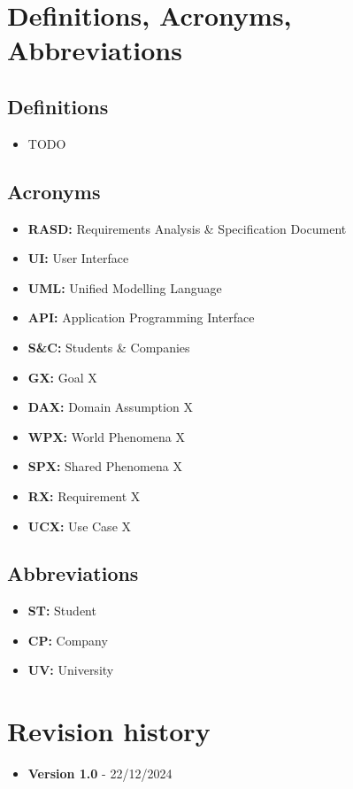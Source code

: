 \section{Definitions, Acronyms, Abbreviations}
\label{sec:definitions_acronyms_abbreviations}%

\subsection{Definitions}
\label{subsec:definitions}%
\begin{itemize}
\item TODO
\end{itemize}


\subsection{Acronyms}
\label{subsec:acronyms}%
\begin{itemize}
    \item \textbf{RASD:} Requirements Analysis \& Specification Document 
    \item \textbf{UI:} User Interface
    \item \textbf{UML:} Unified Modelling Language
    \item \textbf{API:} Application Programming Interface
    \item \textbf{S\&C:} Students \& Companies
    \item \textbf{GX:} Goal X
    \item \textbf{DAX:} Domain Assumption X 
    \item \textbf{WPX:} World Phenomena X
    \item \textbf{SPX:} Shared Phenomena X
    \item \textbf{RX:} Requirement X
    \item \textbf{UCX:} Use Case X
\end{itemize}


\subsection{Abbreviations}
\label{subsec:abbreviations}%
\begin{itemize}
    \item \textbf{ST:} Student
    \item \textbf{CP:} Company
    \item \textbf{UV:} University
\end{itemize}


\section{Revision history}
\label{sec:revision_history}%
\begin{itemize}
    \item \textbf{Version 1.0} - 22/12/2024
\end{itemize}


